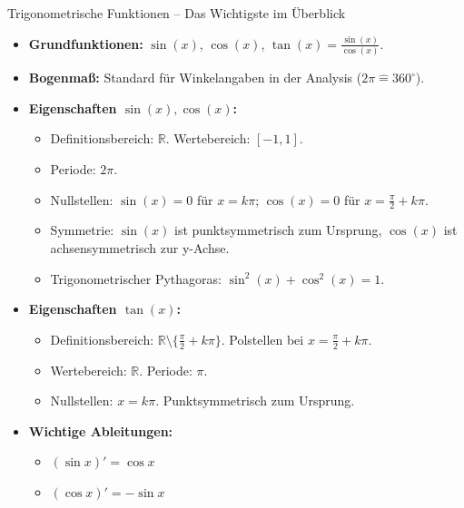 

\begin{kurzknappumgebung}{Trigonometrische Funktionen – Das Wichtigste im Überblick}
\begin{itemize}
    \item \textbf{Grundfunktionen:} $\sin(x)$, $\cos(x)$, $\tan(x) = \frac{\sin(x)}{\cos(x)}$.
    \item \textbf{Bogenmaß:} Standard für Winkelangaben in der Analysis ($2\pi \widehat{=} 360^\circ$).
    \item \textbf{Eigenschaften $\sin(x), \cos(x)$:}
        \begin{itemize}
            \item Definitionsbereich: $\mathbb{R}$. Wertebereich: $[-1, 1]$.
            \item Periode: $2\pi$.
            \item Nullstellen: $\sin(x)=0$ für $x=k\pi$; $\cos(x)=0$ für $x=\frac{\pi}{2}+k\pi$.
            \item Symmetrie: $\sin(x)$ ist punktsymmetrisch zum Ursprung, $\cos(x)$ ist achsensymmetrisch zur y-Achse.
            \item Trigonometrischer Pythagoras: $\sin^2(x) + \cos^2(x) = 1$.
        \end{itemize}
    \item \textbf{Eigenschaften $\tan(x)$:}
        \begin{itemize}
            \item Definitionsbereich: $\mathbb{R} \setminus \{ \frac{\pi}{2} + k\pi \}$. Polstellen bei $x = \frac{\pi}{2} + k\pi$.
            \item Wertebereich: $\mathbb{R}$. Periode: $\pi$.
            \item Nullstellen: $x=k\pi$. Punktsymmetrisch zum Ursprung.
        \end{itemize}
    \item \textbf{Wichtige Ableitungen:}
        \begin{itemize}
            \item $(\sin x)' = \cos x$
            \item $(\cos x)' = -\sin x$

\end{itemize}
\end{itemize}
\end{kurzknappumgebung}
